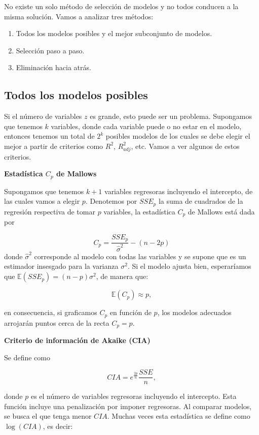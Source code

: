 \documentclass[
]{book}
\providecommand{\tightlist}{%
  \setlength{\itemsep}{0pt}\setlength{\parskip}{0pt}}
\begin{document}
No existe un solo método de selección de modelos y no todos conducen a la misma solución. Vamos a analizar tres métodos:

\begin{enumerate}
\def\labelenumi{\arabic{enumi})}
\tightlist
\item
  Todos los modelos posibles y el mejor subconjunto de modelos.
\item
  Selección paso a paso.
\item
  Eliminación hacia atrás.
\end{enumerate}

\subsection{Todos los modelos posibles}\label{todos-los-modelos-posibles}

Si el número de variables \(z\) es grande, esto puede ser un problema. Supongamos que tenemos \(k\) variables, donde cada variable puede o no estar en el modelo, entonces tenemos un total de \(2^k\) posibles modelos de los cuales se debe elegir el mejor a partir de criterios como \(R^2\), \(R^2_{adj}\), etc. Vamos a ver algunos de estos criterios.

\textbf{Estadística \(C_p\) de Mallows}

Supongamos que tenemos \(k+1\) variables regresoras incluyendo el intercepto, de las cuales vamos a elegir \(p\). Denotemos por \(SSE_p\) la suma de cuadrados de la regresión respectiva de tomar \(p\) variables, la estadística \(C_p\) de Mallows está dada por

\[C_p = \frac{SSE_p}{\hat{\sigma}^2} - (n-2p)  \]
donde \(\hat{\sigma}^2\) corresponde al modelo con todas las variables y se supone que es un estimador insesgado para la varianza \(\sigma^2\). Si el modelo ajusta bien, esperaríamos que \(\mathbb{E}(SSE_p)=(n-p)\sigma^2\), de manera que:

\[\mathbb{E}(C_p)\approx p,\]

en consecuencia, si graficamos \(C_p\) en función de \(p\), los modelos adecuados arrojarán puntos cerca de la recta \(C_p=p\).

\textbf{Criterio de información de Akaike (CIA)}

Se define como

\[CIA = e^{\frac{2p}{n}}\frac{SSE}{n},\]

donde \(p\) es el número de variables regresoras incluyendo el intercepto. Esta función incluye una penalización por imponer regresoras. Al comparar modelos, se busca el que tenga menor \(CIA\). Muchas veces esta estadística se define como \(\log(CIA)\), es decir:
\end{document}
